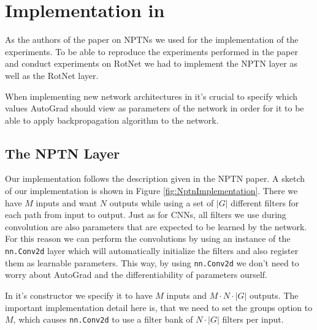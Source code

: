 \documentclass{llncs}
\begin{document}
\section{Implementation in \pytorch}
\newcommand{\nnaffinegrid}{\nolinkurl{nn.functional.affine\textunderscore grid} }
\newcommand{\nngridsample}{\nolinkurl{nn.functional.grid\textunderscore sample} }
\newcommand{\nnConvFunction}{\nolinkurl{nn.functional.conv2d} }
\newcommand{\nnConvLayer}{\nolinkurl{nn.Conv2d} }
\newcommand{\nnMaxPool}{\nolinkurl{nn.MaxPool3d} }
\newcommand{\nnAvgPool}{\nolinkurl{nn.AvgPool3d} }
\newcommand{\nnTensor}{\nolinkurl{nn.Tensor} }
\newcommand{\nnParameter}{\nolinkurl{torch.nn.Parameter} }

As the authors of the paper on NPTNs \cite{NPTN18} we used \pytorch for the implementation of the experiments.
To be able to reproduce the experiments performed in the paper and conduct experiments on RotNet we had to implement the NPTN layer as well as the RotNet layer.

When implementing new network architectures in \pytorch it's crucial to specify which values AutoGrad should view as parameters of the network in order for it to be able to apply backpropagation algorithm to the network. 
\subsection{The NPTN Layer}
Our implementation follows the description given in the NPTN paper. A sketch of our implementation is shown in Figure \ref{fig:NptnImplementation}.
There we have $M$ inputs and want $N$ outputs while using a set of $|G|$ different filters for each path from input to output.
Just as for CNNs, all filters we use during convolution are also parameters that are expected to be learned by the network.
For this reason we can perform the convolutions by using an instance of the \nnConvLayer layer which will automatically initialize the filters and also register them as learnable parameters. This way, by using \nnConvLayer we don't need to worry about AutoGrad and the differentiability of parameters ourself.

In it's constructor we specify it to have $M$ inputs and $M \cdot N \cdot |G|$ outputs. The important implementation detail here is, that we need to set the groups option to $M$, which causes \nnConvLayer to use a filter bank of $N\cdot|G|$ filters per input.
\end{document}
